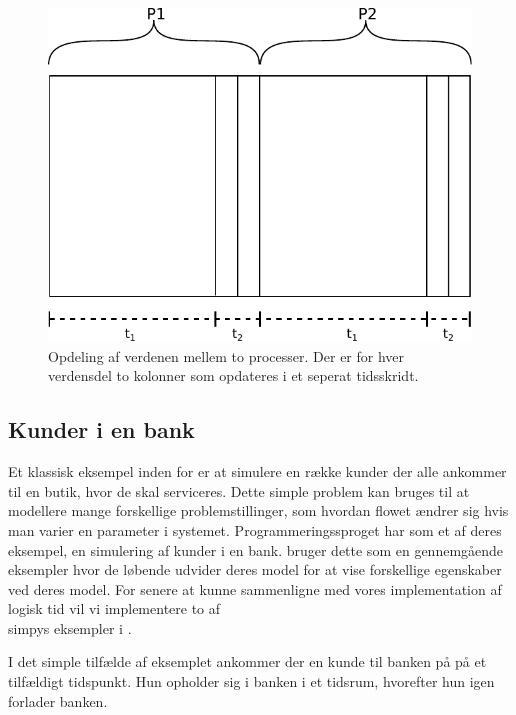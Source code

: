 \begin{figure}[hbtp]
  \begin{center}
  \includegraphics[scale=0.75]{images/wator}
  \caption{Opdeling af verdenen mellem to processer. Der er for hver verdensdel 
  to kolonner som opdateres i et seperat tidsskridt.}
  \label{fig:wator}
  \end{center}
\end{figure}

\subsection{Kunder i en bank}\label{bank-eksempel}
 Et klassisk eksempel inden for \des er at simulere  
en række kunder der alle ankommer til en butik, hvor de skal serviceres. Dette 
simple problem kan bruges til at modellere mange forskellige 
problemstillinger, som hvordan flowet ændrer sig hvis man varier en parameter 
i systemet. Programmeringssproget \simpy{} har som et af deres eksempel, en 
simulering af kunder i en bank. \simpy bruger dette som en gennemgående 
eksempler hvor de løbende udvider deres model for at vise forskellige 
egenskaber ved deres model. For senere at kunne sammenligne \simpy  med vores 
implementation af logisk tid vil vi implementere to af \\simpys eksempler i \pycsp.

I det simple tilfælde af eksemplet ankommer der en kunde til banken på på et 
tilfældigt tidspunkt. Hun opholder sig i banken i et tidsrum, hvorefter hun 
igen forlader banken.

